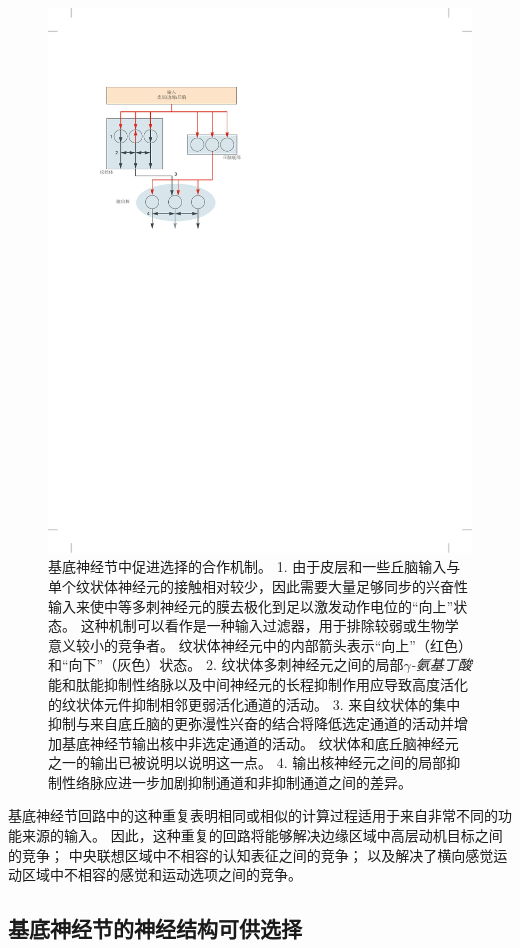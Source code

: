 \begin{figure}[htbp]
	\centering
	\includegraphics[width=0.65\linewidth]{chap38/fig_38_7}
	\caption{基底神经节中促进选择的合作机制。
		1. 由于皮层和一些丘脑输入与单个纹状体神经元的接触相对较少，因此需要大量足够同步的兴奋性输入来使中等多刺神经元的膜去极化到足以激发动作电位的“向上”状态。
		这种机制可以看作是一种输入过滤器，用于排除较弱或生物学意义较小的竞争者。
		纹状体神经元中的内部箭头表示“向上”（红色）和“向下”（灰色）状态。
		2. 纹状体多刺神经元之间的局部\textit{$\gamma$-氨基丁酸}能和肽能抑制性络脉以及中间神经元的长程抑制作用应导致高度活化的纹状体元件抑制相邻更弱活化通道的活动。
		3. 来自纹状体的集中抑制与来自底丘脑的更弥漫性兴奋的结合将降低选定通道的活动并增加基底神经节输出核中非选定通道的活动。
		纹状体和底丘脑神经元之一的输出已被说明以说明这一点。
		4. 输出核神经元之间的局部抑制性络脉应进一步加剧抑制通道和非抑制通道之间的差异。}
	\label{fig:38_7}
\end{figure}


基底神经节回路中的这种重复表明相同或相似的计算过程适用于来自非常不同的功能来源的输入。
因此，这种重复的回路将能够解决边缘区域中高层动机目标之间的竞争；
中央联想区域中不相容的认知表征之间的竞争；
以及解决了横向感觉运动区域中不相容的感觉和运动选项之间的竞争。



\subsection{基底神经节的神经结构可供选择}

